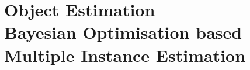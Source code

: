 \chapter{Object Estimation \\ {\Large Bayesian Optimisation based Multiple Instance Estimation}}
\label{chap:objEstimation}


